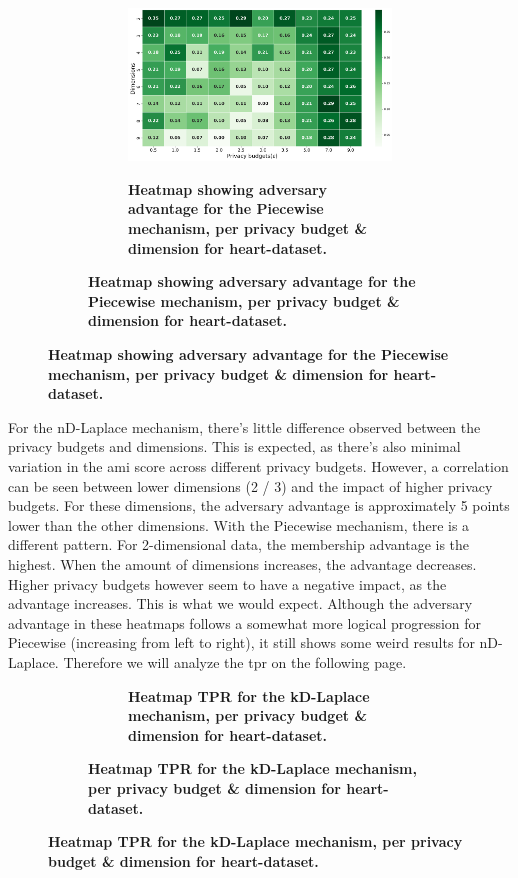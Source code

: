 {\begin{figure}[H]
\begin{subfigure}[b]{0.75\textwidth}
    \begin{subfigure}[c]{1\textwidth}
      \caption{\textbf{Heatmap showing adversary advantage for the Piecewise mechanism, per privacy budget \& dimension for heart-dataset.}}
      \includegraphics[width=1\textwidth]{Results/nd-laplace/piecewise/heart-dataset/attack_adv.png}
      \label{fig:privacy_heart-dataset_adversial_advantage_piecewise}
    \end{subfigure}
  \end{subfigure}
\end{figure}
For the nD-Laplace mechanism, there's little difference observed between the privacy budgets and dimensions. This is expected, as there's also minimal variation in the \gls{ami} score across different privacy budgets. However, a correlation can be seen between lower dimensions (2 / 3) and the impact of higher privacy budgets. For these dimensions, the adversary advantage is approximately 5 points lower than the other dimensions.
With the Piecewise mechanism, there is a different pattern. For 2-dimensional data, the membership advantage is the highest. When the amount of dimensions increases, the advantage decreases. Higher privacy budgets however seem to have a negative impact, as the advantage increases. This is what we would expect.
Although the adversary advantage in these heatmaps follows a somewhat more logical progression for Piecewise (increasing from left to right), it still shows some weird results for nD-Laplace. Therefore we will analyze the \gls{tpr} on the following page. 
\newpage
\begin{figure}[H]
    \centering
    \begin{subfigure}[b]{0.75\textwidth}
        \begin{subfigure}[c]{1\textwidth}
            \caption{\textbf{Heatmap TPR for the kD-Laplace mechanism, per privacy budget \& dimension for heart-dataset.}}

\end{subfigure}
\end{subfigure}
\end{figure}}
